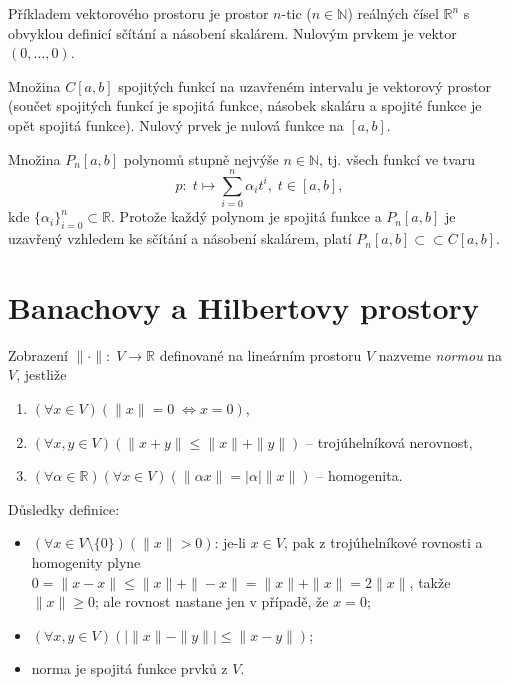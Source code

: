 \begin{ex}
   Příkladem vektorového prostoru je prostor $n$-tic ($n\in\mathbb{N}$)
   reálných čísel $\mathbb{R}^n$ s obvyklou definicí sčítání a násobení skalárem.
   Nulovým prvkem je vektor $(0,\ldots,0)$.
\end{ex}

\begin{ex}
   Množina $C[a,b]$ spojitých funkcí na uzavřeném intervalu je vektorový prostor
   (součet spojitých funkcí je spojitá funkce, násobek skaláru a spojité funkce je
   opět spojitá funkce).
   Nulový prvek je nulová funkce na $[a,b]$.
\end{ex}

\begin{ex}
   Množina $P_n[a,b]$ polynomů stupně nejvýše $n\in\mathbb{N}$, 
   tj. všech funkcí ve tvaru
   \[
      p:\;t\mapsto\sum\limits_{i=0}^{n}\alpha_i t^i, \; t\in[a,b],
   \]
   kde $\{\alpha_i\}_{i=0}^n\subset\mathbb{R}$.
   Protože každý polynom je spojitá funkce a $P_n[a,b]$ je uzavřený vzhledem
   ke sčítání a násobení skalárem, platí $P_n[a,b]\subset\subset C[a,b]$.
\end{ex}

\section{Banachovy a Hilbertovy prostory}

Zobrazení $\|\cdot\|:\;V\rightarrow \mathbb{R}$ definované na lineárním prostoru $V$
nazveme \emph{normou} na $V$, jestliže
\begin{enumerate}
   \item $(\forall x\in V)(\|x\|=0\;\Leftrightarrow x=0)$,
   \item $(\forall x,y\in V)(\|x+y\|\leq\|x\|+\|y\|)$ -- trojúhelníková nerovnost,
   \item $(\forall \alpha\in\mathbb{R})(\forall x\in V)(\|\alpha x\|=|\alpha|\|x\|)$
         -- homogenita.
\end{enumerate}

Důsledky definice:
\begin{itemize}
   \item $(\forall x\in V\setminus\{0\})(\|x\|>0)$:
         je-li $x\in V$, pak z trojúhelníkové rovnosti a homogenity plyne
         $0=\|x-x\|\leq\|x\|+\|-x\|=\|x\|+\|x\|=2\|x\|$, takže $\|x\|\geq 0$;
         ale rovnost nastane jen v případě, že $x=0$;
   \item $(\forall x,y\in V)(|\|x\|-\|y\||\leq \|x-y\|)$;
   \item norma je spojitá funkce prvků z $V$.
\end{itemize}

